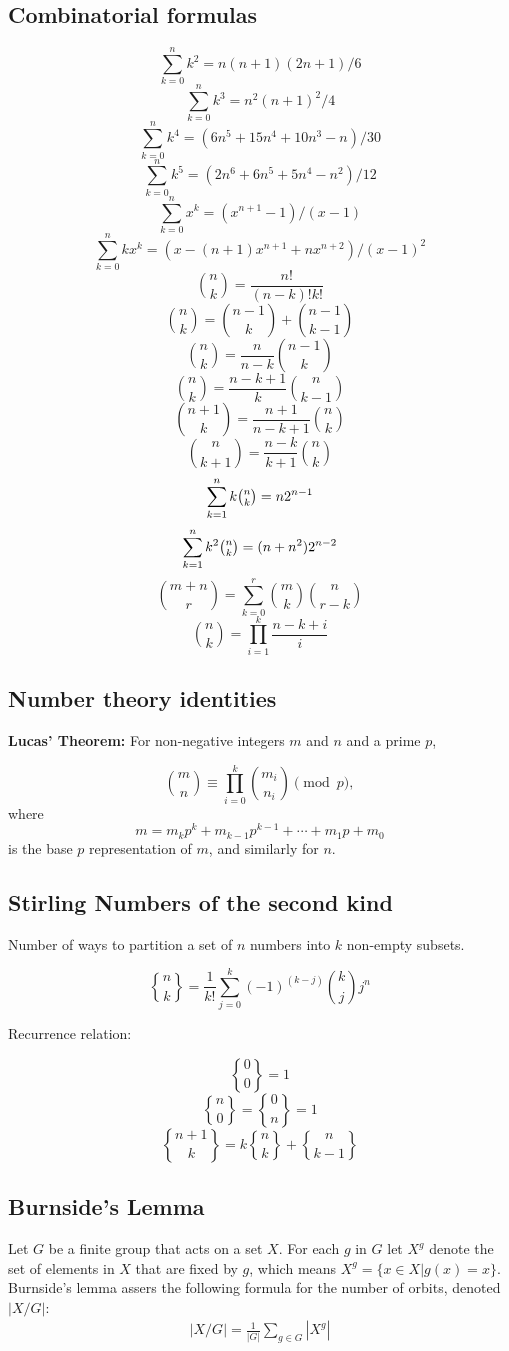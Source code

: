 \subsection{Combinatorial formulas}

 $$\sum_{k=0}^{n}k^{2}=n(n+1)(2n+1)/6$$
 $$\sum_{k=0}^{n}k^{3}=n^{2}(n+1)^{2}/4$$
 $$\sum_{k=0}^{n}k^{4}=(6n^{5}+15n^{4}+10n^{3}-n)/30$$
 $$\sum_{k=0}^{n}k^{5}=(2n^{6}+6n^{5}+5n^{4}-n^{2})/12$$
 $$\sum_{k=0}^{n}x^{k}=(x^{n+1}-1)/(x-1)$$
 $$\sum_{k=0}^{n}kx^{k}=(x-(n+1)x^{n+1}+nx^{n+2})/(x-1)^{2}$$
 $${n \choose k}=\frac{n!}{(n-k)!k!}$$
 $${n \choose k}={n-1 \choose k}+{n-1 \choose k-1}$$
 $${n \choose k}=\frac{n}{n-k}{n-1 \choose k}$$
 $${n \choose k}=\frac{n-k+1}{k}{n \choose k-1}$$
 $${n+1 \choose k}=\frac{n+1}{n-k+1}{n \choose k}$$
 $${n \choose k+1}=\frac{n-k}{k+1}{n \choose k}$$
 $$\sum_{k=1}^{n}k\tbinom{n}{k}=n2^{n-1}$$
 $$\sum_{k=1}^{n}k^{2}\tbinom{n}{k}=(n+n^{2})2^{n-2}$$
 $${m+n \choose r}=\sum_{k=0}^{r}{m \choose k}{n \choose r-k}$$
 $${n \choose k}=\prod_{i=1}^{k}\frac{n-k+i}{i}$$


\subsection{Number theory identities}
\textbf{Lucas' Theorem:} For non-negative integers $m$ and $n$ and a prime $p$,

$$\binom{m}{n}\equiv\prod_{i=0}^k\binom{m_i}{n_i}\pmod p,$$
where
$$m=m_kp^k+m_{k-1}p^{k-1}+\cdots +m_1p+m_0$$
is the base $p$ representation of $m$, and similarly for $n$.

\subsection{Stirling Numbers of the second kind}
Number of ways to partition a set of $n$ numbers into $k$ non-empty subsets.

$${n \brace k}=\frac{1}{k!}\sum_{j=0}^{k}(-1)^{(k-j)}{k \choose j}j^n$$

Recurrence relation:

  $${0 \brace 0}=1$$
  $${n \brace 0}={0 \brace n}=1$$
  $${n+1 \brace k}=k{n \brace k}+{n \brace k-1}$$


\subsection{Burnside's Lemma}
Let $G$ be a finite group that acts on a set $X$. For each $g$ in $G$ let $X^g$ denote the set of elements in $X$ that are fixed by $g$, which means $X^g=\{x\in X| g(x)=x\}$. Burnside's lemma assers the following formula for the number of orbits, denoted $|X/G|$:
\begin{align*}
|X/G|=\frac{1}{|G|} \sum_{g\in G} |X^g|
\end{align*}

